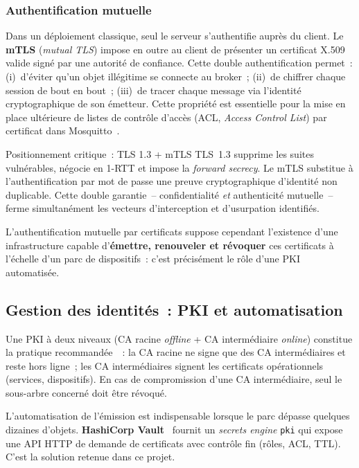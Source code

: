 \subsubsection{Authentification mutuelle}

Dans un déploiement classique, seul le serveur s'authentifie auprès du client. Le \textbf{mTLS} (\emph{mutual TLS}) impose en outre au client de présenter un certificat X.509 valide signé par une autorité de confiance. Cette double authentification permet~: (i)~d'éviter qu'un objet illégitime se connecte au broker~; (ii)~de chiffrer chaque session de bout en bout~; (iii)~de tracer chaque message via l'identité cryptographique de son émetteur. Cette propriété est essentielle pour la mise en place ultérieure de listes de contrôle d'accès (ACL, \emph{Access Control List}) par certificat dans Mosquitto~\cite{mosquitto_tls}.

\begin{resultbox}{Positionnement critique~: TLS 1.3 + mTLS}
TLS~1.3 supprime les suites vulnérables, négocie en 1-RTT et impose la \emph{forward secrecy}. Le mTLS substitue à l'authentification par mot de passe une preuve cryptographique d'identité non duplicable. Cette double garantie~-- confidentialité \emph{et} authenticité mutuelle~-- ferme simultanément les vecteurs d'interception et d'usurpation identifiés.
\end{resultbox}

L'authentification mutuelle par certificats suppose cependant l'existence d'une infrastructure capable d'\textbf{émettre, renouveler et révoquer} ces certificats à l'échelle d'un parc de dispositifs~: c'est précisément le rôle d'une PKI automatisée.

\subsection{Gestion des identités~: PKI et automatisation}
\label{sec:ea-pki}

Une PKI à deux niveaux (CA racine \emph{offline} + CA intermédiaire \emph{online}) constitue la pratique recommandée~\cite{nist_sp800213}~: la CA racine ne signe que des CA intermédiaires et reste hors ligne~; les CA intermédiaires signent les certificats opérationnels (services, dispositifs). En cas de compromission d'une CA intermédiaire, seul le sous-arbre concerné doit être révoqué.

L'automatisation de l'émission est indispensable lorsque le parc dépasse quelques dizaines d'objets. \textbf{HashiCorp Vault}~\cite{vault_pki} fournit un \emph{secrets engine} \texttt{pki} qui expose une API HTTP de demande de certificats avec contrôle fin (rôles, ACL, TTL). C'est la solution retenue dans ce projet.

